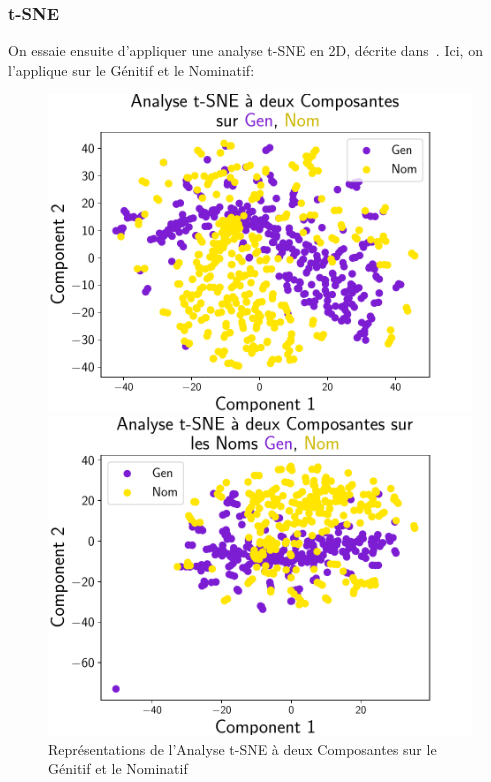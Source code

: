 \documentclass{cours}
\begin{document}
\subsubsection{t-SNE}\label{subsub:tsne}
On essaie ensuite d'appliquer une analyse t-SNE en 2D, décrite dans~\cite{tSNE}.
Ici, on l'applique sur le Génitif et le Nominatif:
\begin{figure}[H]
\begin{minipage}{.5\textwidth}
	\begin{center}
	\includegraphics[width=\linewidth]{Figures/Visualisations/tsne_Gen_Nom.pdf}
	\end{center}
\end{minipage}
\begin{minipage}{.5\textwidth}
	\begin{center}
	\includegraphics[width=\linewidth]{Figures/Visualisations/tsne_Gen_Nom_Nouns.pdf}
	\end{center}
\end{minipage}
\caption{Représentations de l'Analyse t-SNE à deux Composantes sur le Génitif et le Nominatif}
\end{figure}
\end{document}
